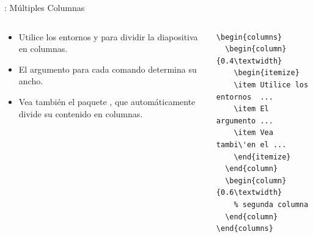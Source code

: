 \documentclass{beamer}
\begin{document}
\begin{frame}[fragile]{\insertsection: Múltiples Columnas}
  \begin{columns}
    \begin{column}{0.4\textwidth}
      \begin{itemize}
      \item Utilice los entornos   y  para
        dividir la diapositiva en columnas.
      \item El argumento para cada comando   determina su
        ancho.
      \item Vea también el paquete , que
        automáticamente divide su contenido en columnas.
      \end{itemize}
    \end{column}
    \begin{column}{0.6\textwidth}
      \begin{verbatim}
\begin{columns}
  \begin{column}{0.4\textwidth}
    \begin{itemize}
    \item Utilice los entornos  ...
    \item El argumento ...
    \item Vea tambi\'en el ...
    \end{itemize}
  \end{column}
  \begin{column}{0.6\textwidth}
    % segunda columna
  \end{column}
\end{columns}
      \end{verbatim}
    \end{column}
  \end{columns}
\end{frame}
\end{document}
